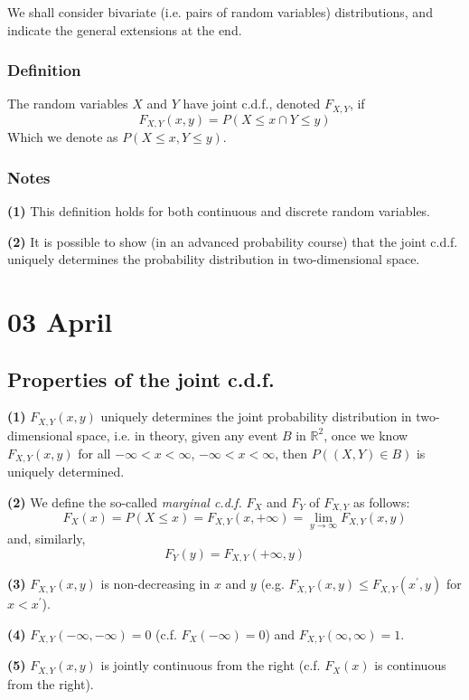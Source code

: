 \documentclass[12pt]{article}
\begin{document}
We shall consider bivariate (i.e. pairs of random variables) distributions, and indicate the general extensions at the end. 

\subsubsection{Definition}
The random variables $X$ and $Y$ have joint c.d.f., denoted $F_{X,Y}$, if
\[
    F_{X,Y} (x,y) = P(X \leq x \cap Y \leq y)
\]
Which we denote as $P(X \leq x, Y \leq y)$. 

\subsubsection{Notes}
\textbf{(1)} This definition holds for both continuous and discrete random variables. 

\textbf{(2)} It is possible to show (in an advanced probability course) that the joint c.d.f. uniquely determines the probability distribution in two-dimensional space. 


\section{03 April}
\subsection{Properties of the joint c.d.f.}

\textbf{(1)} $F_{X,Y} (x,y)$ uniquely determines the joint probability distribution in two-dimensional space, i.e. in theory, given any event $B$ in $\mathds{R}^2$, once we know $F_{X,Y} (x,y)$ for all $-\infty < x < \infty$, $-\infty < x < \infty$, then $P((X,Y) \in B)$ is uniquely determined. 

\textbf{(2)} We define the so-called \emph{marginal c.d.f.} $F_X$ and $F_Y$ of $F_{X,Y}$ as follows:
\[
	F_X (x) = P(X \leq x) = F_{X,Y} (x, + \infty) = \lim_{y \to \infty} F_{X,Y} (x,y)
\]
and, similarly,
\[
	F_Y (y) = F_{X,Y} (+ \infty, y)
\]

\textbf{(3)} $F_{X,Y} (x,y)$ is non-decreasing in $x$ and $y$ (e.g. $F_{X,Y} (x,y) \leq F_{X,Y} (x^{\prime},y)$ for $x < x^{\prime}$).

\textbf{(4)} $F_{X,Y} (-\infty, -\infty) = 0$ (c.f. $F_X (-\infty) = 0$) and $F_{X,Y} (\infty,\infty) = 1$.

\textbf{(5)} $F_{X,Y} (x,y)$ is jointly continuous from the right (c.f. $F_X (x)$ is continuous from the right).
\end{document}
